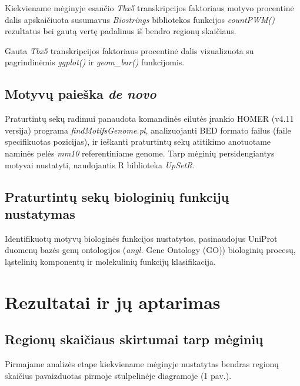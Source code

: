 \documentclass[12pt]{article}
\begin{document}
Kiekviename mėginyje esančio \emph{Tbx5} transkripcijos faktoriaus
motyvo procentinė dalis apskaičiuota susumavus \emph{Biostrings}\cite{BIOSTR}
bibliotekos funkcijos \emph{countPWM()} rezultatus bei gautą
vertę padalinus iš bendro regionų skaičiaus.

Gauta \emph{Tbx5} transkripcijos faktoriaus procentinė dalis
vizualizuota su pagrindinėmis \emph{ggplot()} ir \emph{geom\_bar()}
funkcijomis.

\subsection{Motyvų paieška \emph{de novo}}
Praturtintų sekų radimui panaudota komandinės eilutės įrankio
HOMER\cite{HOMER} (v4.11 versija) programa
\emph{findMotifsGenome.pl},
analizuojanti BED formato failus (faile specifikuotas
pozicijas), ir ieškanti praturtintų sekų atitikimo anotuotame
naminės pelės \emph{mm10} referentiniame genome.
Tarp mėginių persidengiantys motyvai nustatyti, naudojantis
R biblioteka \emph{UpSetR}\cite{UPSETR}.

\subsection{Praturtintų sekų biologinių funkcijų nustatymas}
Identifikuotų motyvų biologinės funkcijos nustatytos, pasinaudojus
UniProt\cite{UNIPROT} duomenų bazės genų ontologijos
(\emph{angl.} Gene Ontology (GO))
biologinių procesų, ląstelinių komponentų ir molekulinių funkcijų
klasifikacija.

\newpage


\section{Rezultatai ir jų aptarimas}
\subsection{Regionų skaičiaus skirtumai tarp mėginių}
Pirmajame analizės etape kiekviename mėginyje nustatytas bendras
regionų skaičius pavaizduotas pirmoje stulpelinėje diagramoje
(1 pav.).
\end{document}
